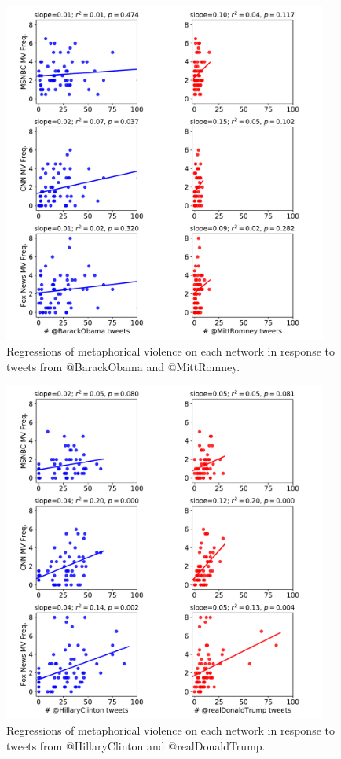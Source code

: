 \begin{figure}[h]
  \centering
    \includegraphics[width=0.95\textwidth]{Figures/2012-network.pdf}
  \caption{Regressions of metaphorical violence on each network in response
   to tweets from @BarackObama and @MittRomney.}
  \label{fig:2012-network}
\end{figure}


\begin{figure}[h]
  \centering
    \includegraphics[width=0.95\textwidth]{Figures/2016-network.pdf}
  \caption{Regressions of metaphorical violence on each network in response
   to tweets from @HillaryClinton and @realDonaldTrump.}
  \label{fig:2016-network}
\end{figure}


